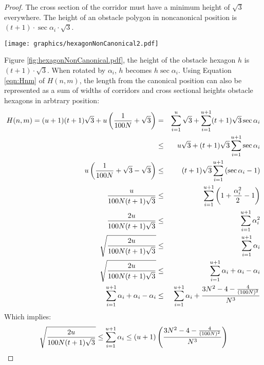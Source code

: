 \begin{proof}
The cross section of the corridor must have a minimum height of $\sqrt{3}$ everywhere.
The height of an obstacle polygon in noncanonical position is $(t+1) \cdot \sec \alpha_i \cdot \sqrt{3}$.

\begin{minipage}{\linewidth}
\begin{center}
\texttt{[image: graphics/hexagonNonCanonical2.pdf]}
\label{fig:hexagonNonCanonical.pdf}
\end{center}
\end{minipage}

Figure \ref{fig:hexagonNonCanonical.pdf}, the height of the obstacle hexagon $h$ is $(t+1) \cdot \sqrt{3}$.  
When rotated by $\alpha_i$, $h$ becomes $h \sec \alpha_i$.
Using Equation \ref{eqn:Hnm} of $H(n,m)$, the length from the canonical position can also be represented as a sum of widths of corridors and cross sectional heights obstacle hexagons in arbtrary position:
\begin{eqnarray*}
H(n,m) = (u+1) (t+1) \sqrt{3} + u \left( \frac{1}{100N} + \sqrt{3} \right)&=& \sum_{i=1}^{u} \sqrt{3} + \sum_{i=1}^{u+1} (t+1) \sqrt{3} \sec \alpha_i \\ 
&\leq& u \sqrt{3} + (t+1) \sqrt{3} \sum_{i = 1}^{u+1} \sec \alpha_i\\
u \left( \frac{1}{100N} + \sqrt{3} - \sqrt{3}  \right) &\leq&(t+1) \sqrt{3}    \sum_{i = 1}^{u+1}  \left( \sec \alpha_i - 1 \right)\\
\frac{u}{100N(t+1)\sqrt{3}}&\leq& \sum_{i = 1}^{u+1} \left( 1 + \frac{\alpha_i^2}{2} - 1 \right)\\
\frac{2u}{100N(t+1)\sqrt{3}}&\leq& \sum_{i = 1}^{u+1} \alpha_i^2\\
\sqrt{\frac{2u}{100N(t+1)\sqrt{3}}} &\leq& \sum_{i=1}^{u+1} \alpha_i\\
\sqrt{\frac{2u}{100N(t+1)\sqrt{3}}} &\leq& \sum_{i=1}^{u+1} \alpha_i + \alpha_i - \alpha_i\\
\sum_{i=1}^{u+1} \alpha_i + \alpha_i - \alpha_i &\leq& \sum_{i=1}^{u+1} \alpha_i + \frac{3N^2 - 4 - \frac{4}{(100N)^2}}{N^3}
\end{eqnarray*}
Which implies:
$$\sqrt{\frac{2u}{100N(t+1)\sqrt{3}}} \leq \sum_{i=1}^{u+1} \alpha_i  \leq (u+1) \left( \frac{3N^2 - 4 - \frac{4}{(100N)^2}}{N^3} \right)$$

\end{proof}
